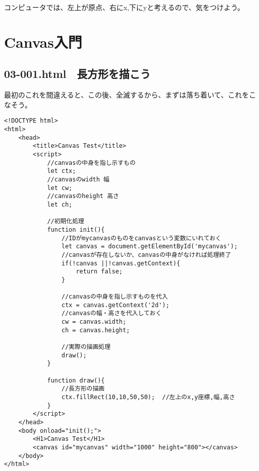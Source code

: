 \documentclass[mingoth,11pt,a4j,uplatex]{jsarticle}
\begin{document}
コンピュータでは、左上が原点、右にx,下にyと考えるので、気をつけよう。

\newpage
\section{Canvas入門}
\subsection{03-001.html　長方形を描こう}
最初のこれを間違えると、この後、全滅するから、まずは落ち着いて、これをこなそう。

\begin{lstlisting}[caption=長方形を描こう]
<!DOCTYPE html>
<html>
	<head>
		<title>Canvas Test</title>
		<script>
			//canvasの中身を指し示すもの
			let ctx;
			//canvasのwidth 幅
			let cw;
			//canvasのheight 高さ
			let ch;
			
			//初期化処理
			function init(){
				//IDがmycanvasのものをcanvasという変数にいれておく
				let canvas = document.getElementById('mycanvas');
				//canvasが存在しないか、canvasの中身がなければ処理終了
				if(!canvas ||!canvas.getContext){
					return false;
				}
				
				//canvasの中身を指し示すものを代入
				ctx = canvas.getContext('2d');
				//canvasの幅・高さを代入しておく
				cw = canvas.width;
				ch = canvas.height;
				
				//実際の描画処理
				draw();
			}
			
			function draw(){
				//長方形の描画
				ctx.fillRect(10,10,50,50);	//左上のx,y座標,幅,高さ
			}
		</script>
	</head>
	<body onload="init();">
		<H1>Canvas Test</H1>
		<canvas id="mycanvas" width="1000" height="800"></canvas>
	</body>
</html>
\end{lstlisting}
\end{document}
